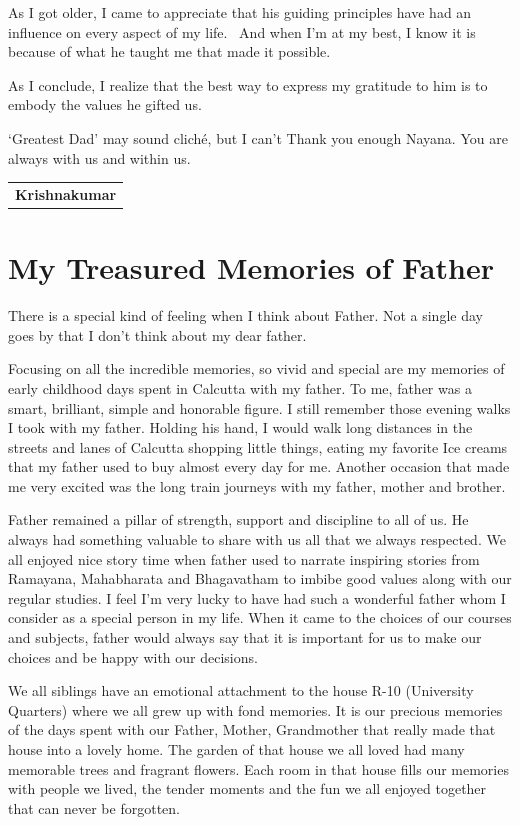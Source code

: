 As I got older, I came to appreciate that his guiding principles have had an influence on every aspect of my life.  And when I’m at my best, I know it is because of what he taught me that made it possible. 

As I conclude, I realize that the best way to express my gratitude to him is to embody the values he gifted us. 

`Greatest Dad' may sound clich\'e, but I can’t Thank you enough Nayana. You are always with us and within us.
\bigskip

\begin{flushright}
\begin{tabular}{c}
\textbf{Krishnakumar}
\end{tabular}
\end{flushright}
\bigskip

\section*{My Treasured Memories of Father}

There is a special kind of feeling when I think about Father.  Not a single day goes by that I don’t think about my dear father.

Focusing on all the incredible memories, so vivid and special are my memories of early childhood days spent in Calcutta with my father. To me, father was a smart, brilliant, simple and honorable figure. I still remember those evening walks I took with my father. Holding his hand, I would walk long distances in the streets and lanes of Calcutta shopping little things, eating my favorite Ice creams that my father used to buy almost every day for me. Another occasion that made me very excited was the long train journeys with my father, mother and brother.

Father remained a pillar of strength, support and discipline to all of us. He always had something valuable to share with us all that we always respected. We all enjoyed nice story time when father used to narrate inspiring stories from Ramayana, Mahabharata and Bhagavatham to imbibe good values along with our regular studies. I feel I’m very lucky to have had such a wonderful father whom I consider as a special person in my life. When it came to the choices of our courses and subjects, father would always say that it is important for us to make our choices and be happy with our decisions.

We all siblings have an emotional attachment to the house R-10 (University Quarters) where we all grew up with fond memories. It is our precious memories of the days spent with our Father, Mother, Grandmother that really made that house into a lovely home. The garden of that house we all loved had many memorable trees and fragrant flowers. Each room in that house fills our memories with people we lived, the tender moments and the fun we all enjoyed together that can never be forgotten.

